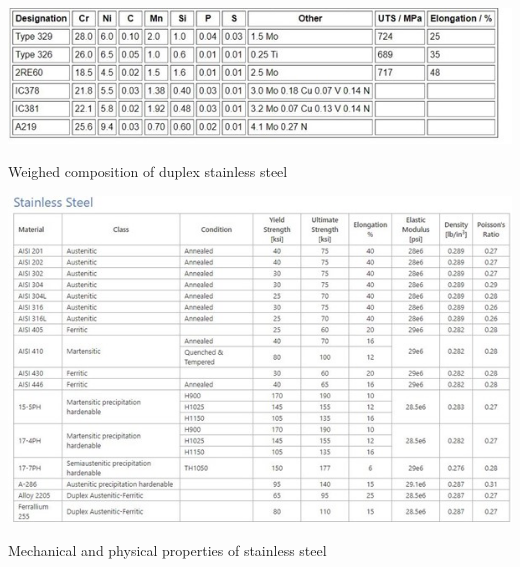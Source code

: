 \documentclass[12pt]{report}
\begin{document}
\begin{table}[H]
    \centering
    \includegraphics[width=\textwidth]{weighed_composition_of_duplex_stainless_steel.jpg}
    \caption{Weighed composition of duplex stainless steel \cite{sourmail2005stainless}}
\end{table}

\begin{table}[H]
    \centering
    \includegraphics[width=\textwidth]{mechanical_and_physical_properties_of_stainless_steel.jpg}
    \caption{Mechanical and physical properties of stainless steel \cite{bhadeshia2017steels}}
\end{table}
\end{document}
